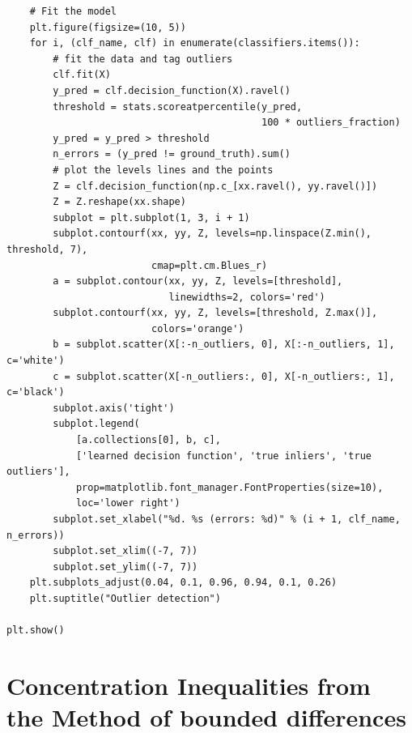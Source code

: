 \begin{mdframed}[hidealllines=true, backgroundcolor=lightgray]
\begin{verbatim}
    # Fit the model
    plt.figure(figsize=(10, 5))
    for i, (clf_name, clf) in enumerate(classifiers.items()):
        # fit the data and tag outliers
        clf.fit(X)
        y_pred = clf.decision_function(X).ravel()
        threshold = stats.scoreatpercentile(y_pred,
                                            100 * outliers_fraction)
        y_pred = y_pred > threshold
        n_errors = (y_pred != ground_truth).sum()
        # plot the levels lines and the points
        Z = clf.decision_function(np.c_[xx.ravel(), yy.ravel()])
        Z = Z.reshape(xx.shape)
        subplot = plt.subplot(1, 3, i + 1)
        subplot.contourf(xx, yy, Z, levels=np.linspace(Z.min(), threshold, 7),
                         cmap=plt.cm.Blues_r)
        a = subplot.contour(xx, yy, Z, levels=[threshold],
                            linewidths=2, colors='red')
        subplot.contourf(xx, yy, Z, levels=[threshold, Z.max()],
                         colors='orange')
        b = subplot.scatter(X[:-n_outliers, 0], X[:-n_outliers, 1], c='white')
        c = subplot.scatter(X[-n_outliers:, 0], X[-n_outliers:, 1], c='black')
        subplot.axis('tight')
        subplot.legend(
            [a.collections[0], b, c],
            ['learned decision function', 'true inliers', 'true outliers'],
            prop=matplotlib.font_manager.FontProperties(size=10),
            loc='lower right')
        subplot.set_xlabel("%d. %s (errors: %d)" % (i + 1, clf_name, n_errors))
        subplot.set_xlim((-7, 7))
        subplot.set_ylim((-7, 7))
    plt.subplots_adjust(0.04, 0.1, 0.96, 0.94, 0.1, 0.26)
    plt.suptitle("Outlier detection")

plt.show()
\end{verbatim}
\end{mdframed}

\chapter{Concentration Inequalities from the Method of bounded differences}


